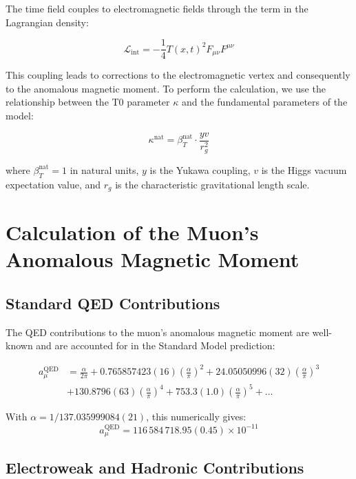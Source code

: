 \documentclass[12pt,a4paper]{article}
\begin{document}
	The time field couples to electromagnetic fields through the term in the Lagrangian density:
	
	\begin{equation}
		\mathcal{L}_{\text{int}} = -\frac{1}{4}T(x,t)^2 F_{\mu\nu}F^{\mu\nu}
	\end{equation}
	
	This coupling leads to corrections to the electromagnetic vertex and consequently to the anomalous magnetic moment. To perform the calculation, we use the relationship between the T0 parameter $\kappa$ and the fundamental parameters of the model:
	
	\begin{equation}
		\kappa^{\text{nat}} = \beta_T^{\text{nat}} \cdot \frac{yv}{r_g^2}
	\end{equation}
	
	where $\beta_T^{\text{nat}} = 1$ in natural units, $y$ is the Yukawa coupling, $v$ is the Higgs vacuum expectation value, and $r_g$ is the characteristic gravitational length scale.
	
	\section{Calculation of the Muon's Anomalous Magnetic Moment}
	
	\subsection{Standard QED Contributions}
	
	The QED contributions to the muon's anomalous magnetic moment are well-known and are accounted for in the Standard Model prediction:
	
	\begin{align}
		a_\mu^{\text{QED}} &= \frac{\alpha}{2\pi} + 0.765857423(16) \left(\frac{\alpha}{\pi}\right)^2 + 24.05050996(32) \left(\frac{\alpha}{\pi}\right)^3 \nonumber\\
		&+ 130.8796(63) \left(\frac{\alpha}{\pi}\right)^4 + 753.3(1.0) \left(\frac{\alpha}{\pi}\right)^5 + \ldots
	\end{align}
	
	With $\alpha = 1/137.035999084(21)$, this numerically gives:
	\begin{equation}
		a_\mu^{\text{QED}} = 116\,584\,718.95(0.45) \times 10^{-11}
	\end{equation}
	
	\subsection{Electroweak and Hadronic Contributions}
	
\end{document}
